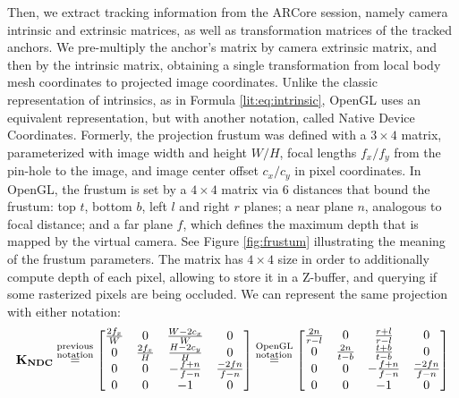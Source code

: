 Then, we extract tracking information from the ARCore session, namely camera intrinsic and extrinsic matrices, as well as transformation matrices of the tracked anchors. We pre-multiply the anchor's matrix by camera extrinsic matrix, and then by the intrinsic matrix, obtaining a single transformation from local body mesh coordinates to projected image coordinates. Unlike the classic representation of intrinsics, as in Formula \ref{lit:eq:intrinsic}, OpenGL uses an equivalent representation, but with another notation, called Native Device Coordinates. Formerly, the projection frustum was defined with a $3 \times 4$ matrix, parameterized with image width and height $W/H$, focal lengths $f_x/f_y$ from the pin-hole to the image, and image center offset $c_x/c_y$ in pixel coordinates. In OpenGL, the frustum is set by a $4 \times 4$ matrix via 6 distances that bound the frustum: top $t$, bottom $b$, left $l$ and right $r$ planes; a near plane $n$, analogous to focal distance; and a far plane $f$, which defines the maximum depth that is mapped by the virtual camera. See Figure \ref{fig:frustum} illustrating the meaning of the frustum parameters. The matrix has $4 \times 4$ size in order to additionally compute depth of each pixel, allowing to store it in a Z-buffer, and querying if some rasterized pixels are being occluded.  We can represent the same projection with either notation:
\begin{equation}
	\bm{\mathrm{K_{NDC}}} \overset{\begin{subarray}{l}\text{previous} \\ \text{notation}\end{subarray}}{=} 
	\begin{bmatrix} 
		\tfrac{2f_x}{W} & 0                & \tfrac{W - 2c_x}{W}  & 0 \\ 
		0               & \tfrac{2f_x}{H}  & \tfrac{H - 2c_y}{H}  & 0 \\
		0               & 0                & -\tfrac{f + n}{f - n} & \tfrac{-2fn}{f - n} \\
		0               & 0                & -1                   & 0
	\end{bmatrix} \overset{\begin{subarray}{l}\text{OpenGL} \\ \text{notation}\end{subarray}}{=} 
	\begin{bmatrix} 
		\tfrac{2n}{r - l} & 0              & \tfrac{r + l}{r - l} & 0 \\
		0               & \tfrac{2n}{t - b}  & \tfrac{t + b}{t - b} & 0 \\
		0               & 0                & -\tfrac{f + n}{f - n} & \tfrac{-2fn}{f - n} \\
		0               & 0                & -1                   & 0
	\end{bmatrix}
	\label{methods:eq:ndc-projection}
\end{equation}

